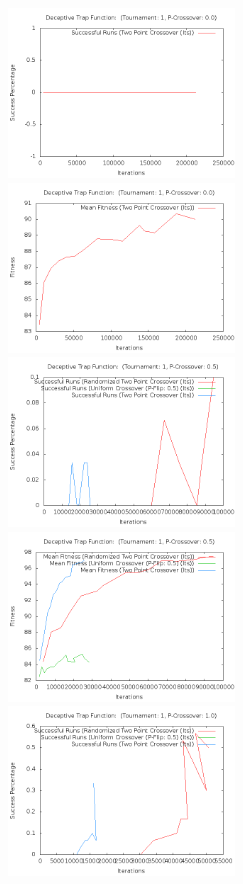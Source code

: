 \documentclass[10pt]{article}
\begin{document}
\begin{figure}[h!]
  \centering
    \includegraphics[height=170px]{img/DeceptiveTrapFunctionRandomIters.png}
    \includegraphics[height=170px]{img/DeceptiveTrapFunctionRandomFitness.png}
    \includegraphics[height=170px]{img/DeceptiveTrapFunctionBothIters.png}
    \includegraphics[height=170px]{img/DeceptiveTrapFunctionBothFitness.png}
    \includegraphics[height=170px]{img/DeceptiveTrapFunctionCrossoverIters.png}

\end{figure}
\end{document}
